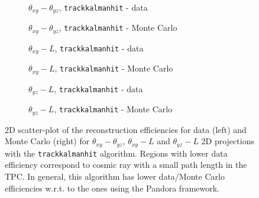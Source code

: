\documentclass[a4paper]{scrartcl}
\begin{document}
\begin{figure}[htbp]
  \begin{subfigure}{0.52\textwidth}
    \caption{$\theta_{xy} - \theta_{yz}$, \texttt{trackkalmanhit} - data} \label{fig:2d_tk1}
  \end{subfigure}
  \begin{subfigure}{0.52\textwidth}
    \caption{$\theta_{xy} - \theta_{yz}$, \texttt{trackkalmanhit} - Monte Carlo}\label{fig:2d_tk1_mc}
  \end{subfigure}
  \begin{subfigure}{0.52\textwidth}
    \caption{$\theta_{xy} - L$, \texttt{trackkalmanhit} - data}\label{fig:2d_tk2}
  \end{subfigure}
  \begin{subfigure}{0.52\textwidth}
    \caption{$\theta_{xy} - L$, \texttt{trackkalmanhit} - Monte Carlo}\label{fig:2d_tk2_mc}
  \end{subfigure}
  \begin{subfigure}{0.52\textwidth}
    \caption{$\theta_{yz} - L$, \texttt{trackkalmanhit} - data}\label{fig:2d_tk3}
  \end{subfigure}
  \begin{subfigure}{0.52\textwidth}
    \caption{$\theta_{yz} - L$, \texttt{trackkalmanhit} - Monte Carlo}\label{fig:2d_tk3_mc}
  \end{subfigure}
  \caption{2D scatter-plot of the reconstruction efficiencies for data (left) and Monte Carlo (right) for $\theta_{xy} - \theta_{yz}$, $\theta_{xy} - L$ and $\theta_{yz} - L$ 2D projections with the \texttt{trackkalmanhit} algorithm. Regions with lower data efficiency correspond to cosmic ray with a small path length in the TPC. In general, this algorithm has lower data/Monte Carlo efficiencies w.r.t. to the ones using the Pandora framework.} \label{fig:2deff_trk}
\end{figure}
\end{document}

